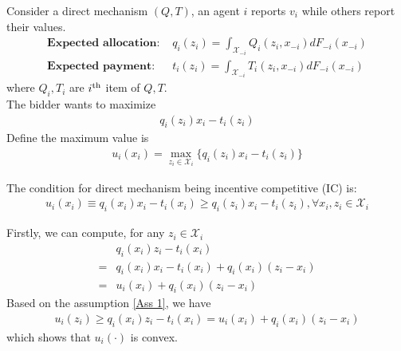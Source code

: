 \documentclass[11pt]{elegantbook}
\begin{document}
Consider a direct mechanism $(Q,T)$, an agent $i$ reports $v_i$ while others report their values.
\begin{equation}
    \begin{aligned}
        \textbf{Expected allocation: }&q_i(z_i)=\int_{\mathcal{X}_{-i}}Q_i(z_i,x_{-i})dF_{-i}(x_{-i})\\
        \textbf{Expected payment: }&t_i(z_i)=\int_{\mathcal{X}_{-i}}T_i(z_i,x_{-i})dF_{-i}(x_{-i})
    \end{aligned}
    \nonumber
\end{equation}
where $Q_i, T_i$ are $i^\textnormal{th}$ item of $Q,T$.\\
The bidder wants to maximize
\begin{equation}
    \begin{aligned}
        q_i(z_i) x_i - t_i(z_i)
    \end{aligned}
    \nonumber
\end{equation}
Define the maximum value is
\begin{equation}
    \begin{aligned}
        u_i(x_i)=\max_{z_i\in \mathcal{X}_i}\{q_i(z_i) x_i - t_i(z_i)\}
    \end{aligned}
    \nonumber
\end{equation}

\begin{assumption}
    The condition for direct mechanism being incentive competitive (IC) is:
    \begin{equation}
        \begin{aligned}
            u_i(x_i)\equiv q_i(x_i) x_i - t_i(x_i)\geq q_i(z_i) x_i - t_i(z_i), \forall x_i, z_i\in \mathcal{X}_i
        \end{aligned}
        \tag{Ass 1}
        \label{Ass 1}
    \end{equation}
\end{assumption}


Firstly, we can compute, for any $z_i\in \mathcal{X}_i$
\begin{equation}
    \begin{aligned}
        &q_i(x_i)z_i-t_i(x_i)\\
        =&q_i(x_i)x_i-t_i(x_i)+q_i(x_i)(z_i-x_i)\\
        =&u_i(x_i)+q_i(x_i)(z_i-x_i)
    \end{aligned}
    \nonumber
\end{equation}
Based on the assumption \ref{Ass 1}, we have
\begin{equation}
    \begin{aligned}
        u_i(z_i)\geq q_i(x_i)z_i-t_i(x_i)=u_i(x_i)+q_i(x_i)(z_i-x_i)
    \end{aligned}
    \nonumber
\end{equation}
which shows that $u_i(\cdot)$ is convex.
\end{document}
